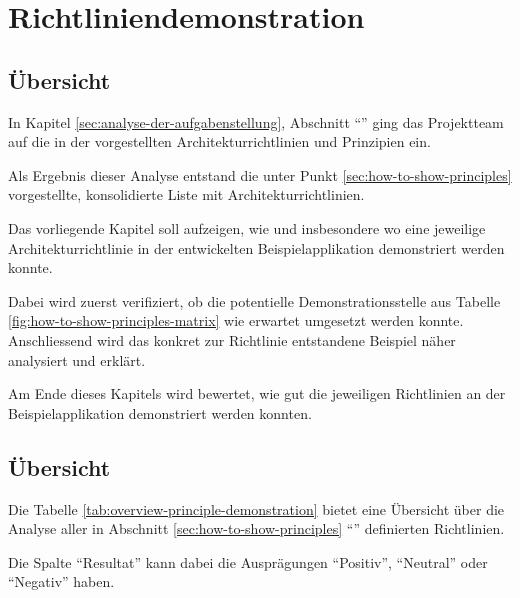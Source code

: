 \chapter{Richtliniendemonstration}
\label{sec:principle-demonstration}

\section*{Übersicht}

In Kapitel \ref{sec:analyse-der-aufgabenstellung}, Abschnitt ``'' ging das Projektteam auf die in der  vorgestellten Architekturrichtlinien und Prinzipien ein.

Als Ergebnis dieser Analyse entstand die unter Punkt \ref{sec:how-to-show-principles} vorgestellte, konsolidierte Liste mit Architekturrichtlinien.

Das vorliegende Kapitel soll aufzeigen, wie und insbesondere wo eine jeweilige Architekturrichtlinie in der entwickelten Beispielapplikation demonstriert werden konnte.

Dabei wird zuerst verifiziert, ob die potentielle Demonstrationsstelle aus Tabelle \ref{fig:how-to-show-principles-matrix} wie erwartet umgesetzt werden konnte.
Anschliessend wird das konkret zur Richtlinie entstandene Beispiel näher analysiert und erklärt.

Am Ende dieses Kapitels wird bewertet, wie gut die jeweiligen Richtlinien an der Beispielapplikation demonstriert werden konnten.

\newpage
\section{Übersicht}

Die Tabelle \ref{tab:overview-principle-demonstration} bietet eine Übersicht über die Analyse aller in Abschnitt \ref{sec:how-to-show-principles} ``'' definierten Richtlinien.

Die Spalte ``Resultat'' kann dabei die Ausprägungen ``Positiv'', ``Neutral'' oder ``Negativ'' haben.

